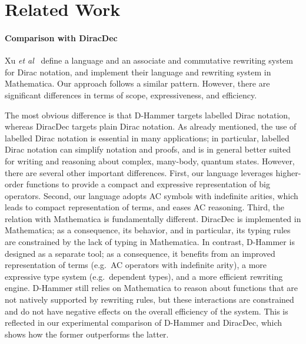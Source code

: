 \section{Related Work}\label{sec:relwork}

\paragraph*{Comparison with DiracDec}
Xu \emph{et al}~\cite{diracdec} define a language and an associate and
commutative rewriting system for Dirac notation, and implement their
language and rewriting system in Mathematica. Our approach follows a
similar pattern. However, there are significant differences in terms
of scope, expressiveness, and efficiency. 

The most obvious difference is that D-Hammer targets labelled Dirac
notation, whereas DiracDec targets plain Dirac notation. As already
mentioned, the use of labelled Dirac notation is essential in many
applications; in particular, labelled Dirac notation can simplify
notation and proofs, and is in general better suited for writing and
reasoning about complex, many-body, quantum states. However, there are
several other important differences. First, our language leverages
higher-order functions to provide a compact and expressive
representation of big operators. Second, our language adopts AC
symbols with indefinite arities, which leads to compact representation
of terms, and eases AC reasoning. Third, the relation with Mathematica
is fundamentally different. DiracDec is implemented in Mathematica; as
a consequence, its behavior, and in particular, its typing rules are
constrained by the lack of typing in Mathematica. In contrast,
D-Hammer is designed as a separate tool; as a consequence, it benefits
from an improved representation of terms (e.g.\, AC operators with
indefinite arity), a more expressive type system (e.g.\, dependent
types), and a more efficient rewriting engine. D-Hammer still relies
on Mathematica to reason about functions that are not natively
supported by rewriting rules, but these interactions are constrained
and do not have negative effects on the overall efficiency of the
system. This is reflected in our experimental comparison of D-Hammer
and DiracDec, which shows how the former outperforms the latter.


